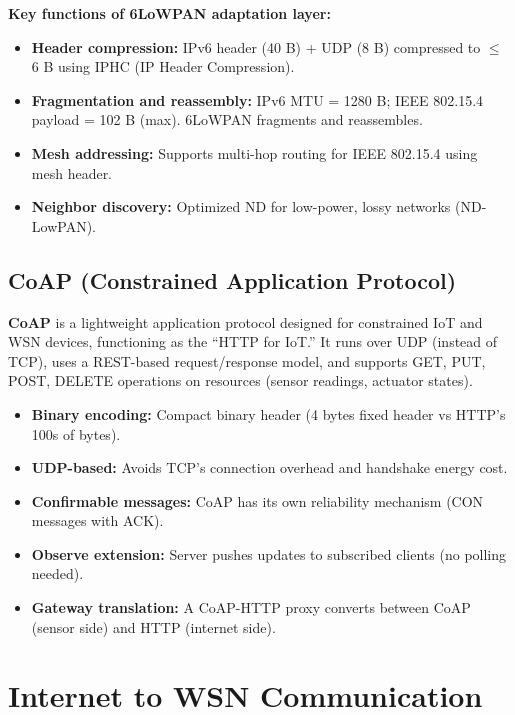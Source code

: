 \documentclass[12pt,a4paper]{article}
\begin{document}
\textbf{Key functions of 6LoWPAN adaptation layer:}
\begin{itemize}[leftmargin=*, itemsep=3pt]
  \item \textbf{Header compression:} IPv6 header (40 B) + UDP (8 B) compressed to $\leq$ 6 B using IPHC (IP Header Compression).
  \item \textbf{Fragmentation and reassembly:} IPv6 MTU = 1280 B; IEEE 802.15.4 payload = 102 B (max). 6LoWPAN fragments and reassembles.
  \item \textbf{Mesh addressing:} Supports multi-hop routing for IEEE 802.15.4 using mesh header.
  \item \textbf{Neighbor discovery:} Optimized ND for low-power, lossy networks (ND-LowPAN).
\end{itemize}

\subsection{CoAP (Constrained Application Protocol)}

\begin{tcolorbox}[defbox, title={\textbf{CoAP --- Definition}}]
\textbf{CoAP} is a lightweight application protocol designed for constrained IoT and WSN devices, functioning as the ``HTTP for IoT.'' It runs over UDP (instead of TCP), uses a REST-based request/response model, and supports GET, PUT, POST, DELETE operations on resources (sensor readings, actuator states).
\end{tcolorbox}

\begin{itemize}[leftmargin=*, itemsep=3pt]
  \item \textbf{Binary encoding:} Compact binary header (4 bytes fixed header vs HTTP's 100s of bytes).
  \item \textbf{UDP-based:} Avoids TCP's connection overhead and handshake energy cost.
  \item \textbf{Confirmable messages:} CoAP has its own reliability mechanism (CON messages with ACK).
  \item \textbf{Observe extension:} Server pushes updates to subscribed clients (no polling needed).
  \item \textbf{Gateway translation:} A CoAP-HTTP proxy converts between CoAP (sensor side) and HTTP (internet side).
\end{itemize}

\section{Internet to WSN Communication}
\end{document}
